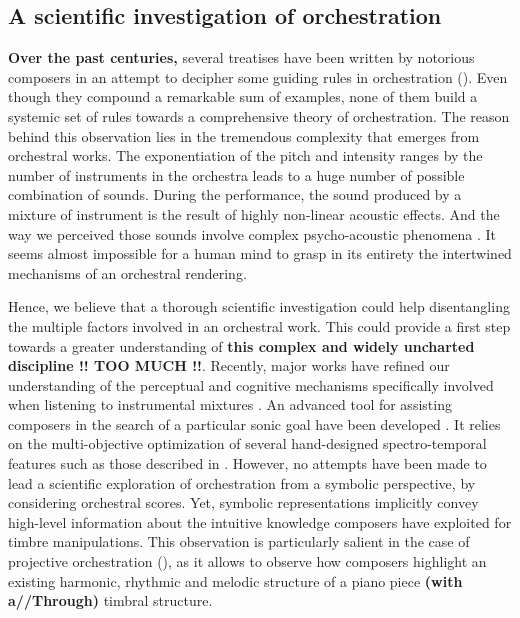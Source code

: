 \documentclass[twoside,twocolumn]{article}
\begin{document}
\subsection{A scientific investigation of orchestration}
\textbf{Over the past centuries,} several treatises have been written by notorious composers in an attempt to decipher some guiding rules in orchestration (\cite{koechli_orch,piston-orch,Rimsky-Korsakov:1873aa}).
Even though they compound a remarkable sum of examples, none of them build a systemic set of rules towards a comprehensive theory of orchestration.
The reason behind this observation lies in the tremendous complexity that emerges from orchestral works. The exponentiation of the pitch and intensity ranges by the number of instruments in the orchestra leads to a huge number of possible combination of sounds. During the performance, the sound produced by a mixture of instrument is the result of highly non-linear acoustic effects. And the way we perceived those sounds involve complex psycho-acoustic phenomena \cite{lembke2012timbre,tardieu2012perception,mcadams2009perception}.
It seems almost impossible for a human mind to grasp in its entirety the intertwined mechanisms of an orchestral rendering.

Hence, we believe that a thorough scientific investigation could help disentangling the multiple factors involved in an orchestral work. This could provide a first step towards a greater understanding of \textbf{this complex and widely uncharted discipline !! TOO MUCH !!}.
Recently, major works have refined our understanding of the perceptual and cognitive mechanisms specifically involved when listening to instrumental mixtures \cite{pressnitzer2000perception,tardieu2012perception,mcadams2013timbre}. An advanced tool for assisting composers in the search of a particular sonic goal have been developed \cite{esling2010dynamic}. It relies on the multi-objective optimization of several hand-designed spectro-temporal features such as those described in \cite{peeters2011timbre}.
However, no attempts have been made to lead a scientific exploration of orchestration from a symbolic perspective, by considering orchestral scores.
Yet, symbolic representations implicitly convey high-level information about the intuitive knowledge composers have exploited for timbre manipulations. 
This observation is particularly salient in the case of projective orchestration (), as it allows to observe how composers highlight an existing harmonic, rhythmic and melodic structure of a piano piece \textbf{(with a//Through)} timbral structure.
\end{document}
